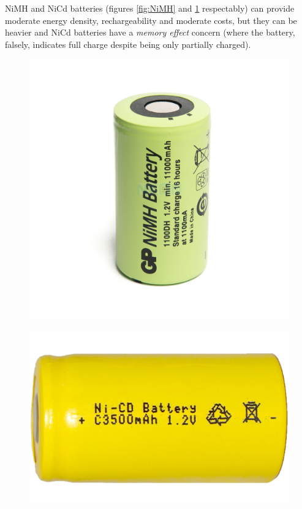 \gls{NiMH} and \gls{NiCd} batteries (figures \ref{fig:NiMH} and \ref{fig:NiCd} respectably) can provide moderate energy density, rechargeability and moderate costs, but they can be heavier and \gls{NiCd} batteries have a \textit{memory effect} concern (where the battery, falsely, indicates full charge despite being only partially charged).
\begin{figure}[H]
    \centering
    \begin{minipage}{.5\textwidth}
        \centering
        \includegraphics[width=.5\linewidth]{ch4/assets/nimh.jpg}
        \label{fig:NiMH}
    \end{minipage}%
    \begin{minipage}{.5\textwidth}
        \centering
        \includegraphics[width=.5\linewidth]{ch4/assets/nicd.jpg}
        \label{fig:NiCd}
    \end{minipage}
\end{figure}


